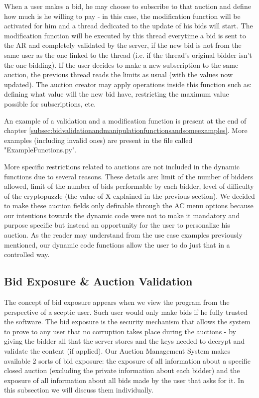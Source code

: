 \documentclass[a4paper]{article}
\begin{document}
When a user makes a bid, he may choose to subscribe to that auction and define how much is he willing to pay - in this case, the modification function will be activated for him and a thread dedicated to the update of his bids will start.
The modification function will be executed by this thread everytime a bid is sent to the AR and completely validated by the server, if the new bid is not from the same user as the one linked to the thread (i.e. if the thread's original bidder isn't the one bidding). 
If the user decides to make a new subscription to the same auction, the previous thread reads the limits as usual (with the values now updated).
The auction creator may apply operations inside this function such as: defining what value will the new bid have, restricting the maximum value possible for subscriptions, etc.

An example of a validation and a modification function is present at the end of chapter \ref{subsec:bidvalidationandmanipulationfunctionsandsomeexamples}. More examples (including invalid ones) are present in the file called "ExampleFunctions.py".

More specific restrictions related to auctions are not included in the dynamic functions due to several reasons.
These details are: limit of the number of bidders allowed, limit of the number of bids performable by each bidder, level of difficulty of the cryptopuzzle (the value of X explained in the previous section).
We decided to make these auction fields only definable through the AC menu options because our intentions towards the dynamic code were not to make it mandatory and purpose specific but instead an opportunity for the user to personalize his auction.
As the reader may understand from the use case examples previously mentioned, our dynamic code functions allow the user to do just that in a controlled way.

\newpage
\subsection{Bid Exposure \& Auction Validation}
\label{subsec:bidexposureandauctionvalidation}

The concept of bid exposure appears when we view the program from the perspective of a sceptic user.
Such user would only make bids if he fully trusted the software.
The bid exposure is the security mechanism that allows the system to prove to any user that no corruption takes place during the auctions - by giving the bidder all that the server stores and the keys needed to decrypt and validate the content (if applied). 
Our Auction Management System makes available 2 sorts of bid exposure: the exposure of all information about a specific closed auction (excluding the private information about each bidder) and the exposure of all information about all bids made by the user that asks for it.
In this subsection we will discuss them individually.
\end{document}
